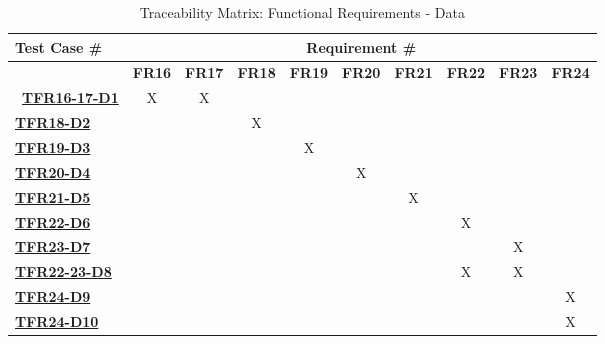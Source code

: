\documentclass[12pt, titlepage]{article}
\begin{document}
\begin{landscape}
\begin{table}[H]
    \centering
    \begin{adjustbox}{width=1\textwidth}
    \begin{tabular}{l|ccccccccc}
        \textbf{Test Case \#} & \multicolumn{9}{c}{\textbf{Requirement \#}}\\
        \hline
        ~ & \textbf{FR16} & \textbf{FR17} & \textbf{FR18} & \textbf{FR19} & \textbf{FR20} & \textbf{FR21} & \textbf{FR22} & \textbf{FR23} & \textbf{FR24} \\\
        \hyperref[TFR16-17-D1] \textbf{TFR16-17-D1}  & X & X & ~ & ~ & ~ & ~ & ~ & ~ & ~ \\
        \hyperref[TFR18-D2] \textbf{TFR18-D2}  & ~ & ~ & X & ~ & ~ & ~ & ~ & ~ & ~ \\
        \hyperref[TFR19-D3] \textbf{TFR19-D3}  & ~ & ~ & ~ & X & ~ & ~ & ~ & ~ & ~ \\
        \hyperref[TFR20-D4] \textbf{TFR20-D4}  & ~ & ~ & ~ & ~ & X & ~ & ~ & ~ & ~ \\
        \hyperref[TFR21-D5] \textbf{TFR21-D5}  & ~ & ~ & ~ & ~ & ~ & X & ~ & ~ & ~ \\
        \hyperref[TFR22-D6] \textbf{TFR22-D6}  & ~ & ~ & ~ & ~ & ~ & ~ & X & ~ & ~ \\
        \hyperref[TFR23-D7] \textbf{TFR23-D7}  & ~ & ~ & ~ & ~ & ~ & ~ & ~ & X & ~ \\
        \hyperref[TFR22-23-D8] \textbf{TFR22-23-D8}  & ~ & ~ & ~ & ~ & ~ & ~ & X & X & ~ \\
        \hyperref[TFR24-D9] \textbf{TFR24-D9}  & ~ & ~ & ~ & ~ & ~ & ~ & ~ & ~ & X \\
        \hyperref[TFR24-D10] \textbf{TFR24-D10}  & ~ & ~ & ~ & ~ & ~ & ~ & ~ & ~ & X \\
    \end{tabular}
    \end{adjustbox}
    \caption{Traceability Matrix: Functional Requirements - Data}
    \label{Traceability Matrix: Functional Requirements - Data}
\end{table}


\end{landscape}
\end{document}
